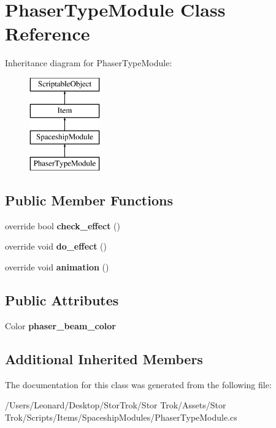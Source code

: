 \hypertarget{class_phaser_type_module}{}\section{Phaser\+Type\+Module Class Reference}
\label{class_phaser_type_module}
Inheritance diagram for Phaser\+Type\+Module\+:\begin{figure}[H]
\begin{center}
\leavevmode
\includegraphics[height=4.000000cm]{class_phaser_type_module}
\end{center}
\end{figure}
\subsection*{Public Member Functions}
\begin{DoxyCompactItemize}
\item 
\mbox{\label{class_phaser_type_module_a5eb7be4356bc7c8656a0a1c399911506}} 
override bool {\bfseries check\+\_\+effect} ()
\item 
\mbox{\label{class_phaser_type_module_abc8c8e6fb18e6f44d115032b3ce9816c}} 
override void {\bfseries do\+\_\+effect} ()
\item 
\mbox{\label{class_phaser_type_module_a3e4f570c93e6e1ddd274e92419030d30}} 
override void {\bfseries animation} ()
\end{DoxyCompactItemize}
\subsection*{Public Attributes}
\begin{DoxyCompactItemize}
\item 
\mbox{\label{class_phaser_type_module_a8a91ad074d4bb8735e25b53fb31363f5}} 
Color {\bfseries phaser\+\_\+beam\+\_\+color}
\end{DoxyCompactItemize}
\subsection*{Additional Inherited Members}


The documentation for this class was generated from the following file\+:\begin{DoxyCompactItemize}
\item 
/\+Users/\+Leonard/\+Desktop/\+Stor\+Trok/\+Stor Trok/\+Assets/\+Stor Trok/\+Scripts/\+Items/\+Spaceship\+Modules/Phaser\+Type\+Module.\+cs\end{DoxyCompactItemize}

